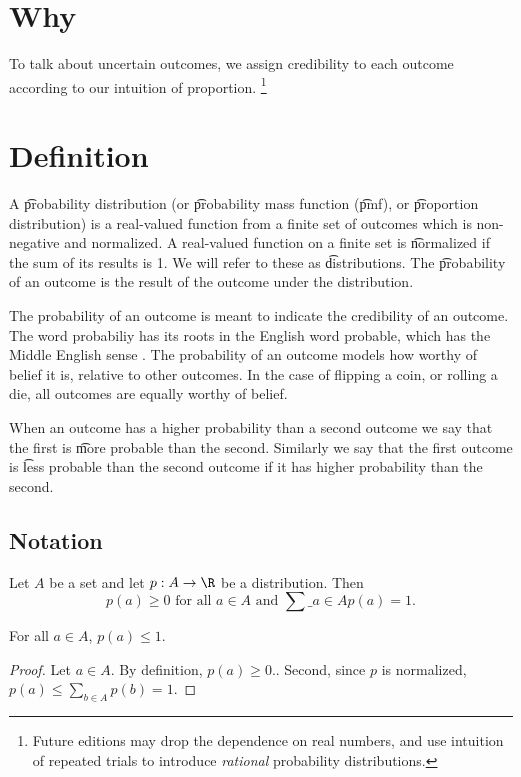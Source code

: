 
\section*{Why}

To talk about uncertain outcomes, we assign credibility to each outcome according to our intuition of proportion.
  \ifhmode\unskip\fi\footnote{
Future editions may drop the dependence on real numbers, and use intuition of repeated trials to introduce \textit{rational} probability distributions.
  }

\section*{Definition}

A \t{probability distribution} (or \t{probability mass function} (\t{pmf}), or \t{proportion distribution}) is a real-valued function from a finite set of outcomes which is non-negative and normalized.
A real-valued function on a finite set is \t{normalized} if the sum of its results is 1.
We will refer to these as \t{distributions}.
The \t{probability of an outcome} is the result of the outcome under the distribution.

The probability of an outcome is meant to indicate the credibility of an outcome.
The word probabiliy has its roots in the English word probable, which has the Middle English sense .
The probability of an outcome models how worthy of belief it is, relative to other outcomes.
In the case of flipping a coin, or rolling a die, all outcomes are equally worthy of belief.

When an outcome has a higher probability than a second outcome we say that the first is \t{more probable} than the second.
Similarly we say that the first outcome is \t{less probable} than the second outcome if it has higher probability than the second.

\subsection*{Notation}

Let $A$ be a set and let $p: A \to \R $ be a distribution.
Then
  \[
\textstyle
p(a) \geq 0 \text{ for all } a \in A \text{ and } \sum\_{a \in A} p(a) = 1.
  \]

\begin{proposition}For all $a \in A$, $p(a) \leq 1$.
\begin{proof}Let $a \in A$.
By definition, $p(a) \geq 0$..
Second, since $p$ is normalized, $p(a) \leq \sum_{b \in A} p(b) = 1$.\end{proof}\end{proposition}
